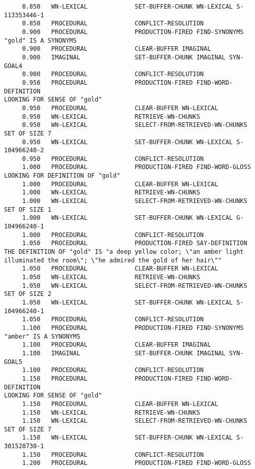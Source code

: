 \begin{verbatim}
     0.850   WN-LEXICAL             SET-BUFFER-CHUNK WN-LEXICAL S-113353446-1 
     0.850   PROCEDURAL             CONFLICT-RESOLUTION 
     0.900   PROCEDURAL             PRODUCTION-FIRED FIND-SYNONYMS 
"gold" IS A SYNONYMS 
     0.900   PROCEDURAL             CLEAR-BUFFER IMAGINAL 
     0.900   IMAGINAL               SET-BUFFER-CHUNK IMAGINAL SYN-GOAL4 
     0.900   PROCEDURAL             CONFLICT-RESOLUTION 
     0.950   PROCEDURAL             PRODUCTION-FIRED FIND-WORD-DEFINITION 
LOOKING FOR SENSE OF "gold" 
     0.950   PROCEDURAL             CLEAR-BUFFER WN-LEXICAL 
     0.950   WN-LEXICAL             RETRIEVE-WN-CHUNKS 
     0.950   WN-LEXICAL             SELECT-FROM-RETRIEVED-WN-CHUNKS SET OF SIZE 7 
     0.950   WN-LEXICAL             SET-BUFFER-CHUNK WN-LEXICAL S-104966240-2 
     0.950   PROCEDURAL             CONFLICT-RESOLUTION 
     1.000   PROCEDURAL             PRODUCTION-FIRED FIND-WORD-GLOSS 
LOOKING FOR DEFINITION OF "gold" 
     1.000   PROCEDURAL             CLEAR-BUFFER WN-LEXICAL 
     1.000   WN-LEXICAL             RETRIEVE-WN-CHUNKS 
     1.000   WN-LEXICAL             SELECT-FROM-RETRIEVED-WN-CHUNKS SET OF SIZE 1 
     1.000   WN-LEXICAL             SET-BUFFER-CHUNK WN-LEXICAL G-104966240-1 
     1.000   PROCEDURAL             CONFLICT-RESOLUTION 
     1.050   PROCEDURAL             PRODUCTION-FIRED SAY-DEFINITION 
THE DEFINITION OF "gold" IS "a deep yellow color; \"an amber light illuminated the room\"; \"he admired the gold of her hair\"" 
     1.050   PROCEDURAL             CLEAR-BUFFER WN-LEXICAL 
     1.050   WN-LEXICAL             RETRIEVE-WN-CHUNKS 
     1.050   WN-LEXICAL             SELECT-FROM-RETRIEVED-WN-CHUNKS SET OF SIZE 2 
     1.050   WN-LEXICAL             SET-BUFFER-CHUNK WN-LEXICAL S-104966240-1 
     1.050   PROCEDURAL             CONFLICT-RESOLUTION 
     1.100   PROCEDURAL             PRODUCTION-FIRED FIND-SYNONYMS 
"amber" IS A SYNONYMS 
     1.100   PROCEDURAL             CLEAR-BUFFER IMAGINAL 
     1.100   IMAGINAL               SET-BUFFER-CHUNK IMAGINAL SYN-GOAL5 
     1.100   PROCEDURAL             CONFLICT-RESOLUTION 
     1.150   PROCEDURAL             PRODUCTION-FIRED FIND-WORD-DEFINITION 
LOOKING FOR SENSE OF "gold" 
     1.150   PROCEDURAL             CLEAR-BUFFER WN-LEXICAL 
     1.150   WN-LEXICAL             RETRIEVE-WN-CHUNKS 
     1.150   WN-LEXICAL             SELECT-FROM-RETRIEVED-WN-CHUNKS SET OF SIZE 7 
     1.150   WN-LEXICAL             SET-BUFFER-CHUNK WN-LEXICAL S-301528730-1 
     1.150   PROCEDURAL             CONFLICT-RESOLUTION 
     1.200   PROCEDURAL             PRODUCTION-FIRED FIND-WORD-GLOSS 

\end{verbatim}
